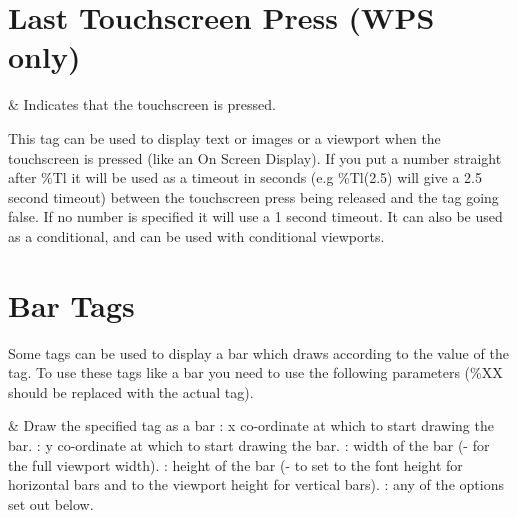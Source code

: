 {  \section{Last Touchscreen Press (WPS only)}
    \begin{tagmap}
       & Indicates that the touchscreen is pressed.\\
    \end{tagmap}
  This tag can be used to display text or images or a viewport when the
  touchscreen is pressed (like an On Screen Display). If you put a number
  straight after \%Tl it will be used as a timeout in seconds
  (e.g \%Tl(2.5) will give a 2.5 second timeout) between the touchscreen press
  being released and the tag going false. If no number is specified it will
  use a 1 second timeout.  It can also be used as a conditional, and can be
  used with conditional viewports.
}

\section{\label{ref:bar_tags}Bar Tags}
  Some tags can be used to display a bar which draws according to the value of
  the tag. To use these tags like a bar you need to use the following parameters
  (\%XX should be replaced with the actual tag).

\begin{tagmap}
    & Draw the specified tag as a bar\newline
      : x co-ordinate at which to start drawing the bar.\newline
      : y co-ordinate at which to start drawing the bar.\newline
      : width of the bar (- for the full viewport width).\newline
      : height of the bar (- to set to the font height for
        horizontal bars and to the viewport height for vertical bars).\newline
      : any of the options set out below.\\
\end{tagmap}

